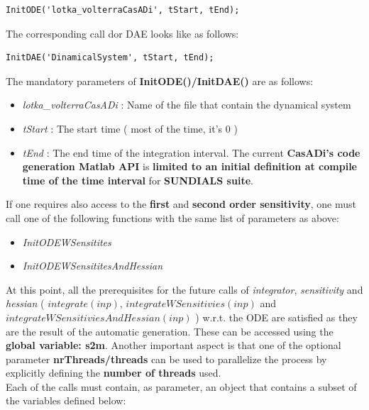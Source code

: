 \documentclass[12pt, letterpaper]{article}
\begin{document}
\begin{lstlisting}
InitODE('lotka_volterraCasADi', tStart, tEnd);
\end{lstlisting}

The corresponding call dor DAE looks like as follows:
\begin{lstlisting}
InitDAE('DinamicalSystem', tStart, tEnd);
\end{lstlisting}

The mandatory parameters of \textbf{InitODE()/InitDAE()} are as follows: 

\begin{itemize}
	\item \textit{lotka\_volterraCasADi} : Name of the file that contain the dynamical system
	\item \textit{tStart} : The start time ( most of the time, it's $0$ )
	\item \textit{tEnd} : The end time of the integration interval. The current \textbf{ CasADi's code generation Matlab API} is \textbf{limited to an initial definition at compile time of the time interval} for \textbf{SUNDIALS suite}.
\end{itemize}

If one requires also access to the \textbf{ first} and \textbf{second order sensitivity}, one must call one of the following functions with the same list of parameters as above:
\begin{itemize}
	\item \textit{InitODEWSensitites}
	\item \textit{InitODEWSensititesAndHessian}
\end{itemize}


At this point, all the prerequisites for the future calls of \textit{integrator}, \textit{sensitivity} and \textit{hessian} ( $integrate(inp)$, $integrateWSensitivies(inp)$ and  $integrateWSensitiviesAndHessian(inp)$ ) w.r.t. the ODE are satisfied as they are the result of the automatic generation. These can be accessed using the \textbf{global variable: s2m}. Another important aspect is that one of the optional parameter \textbf{nrThreads/threads} can be used to parallelize the process by explicitly defining the \textbf{ number of threads} used. \\ 

Each of the calls must contain, as parameter, an object that contains a subset of the variables defined below:
\end{document}
